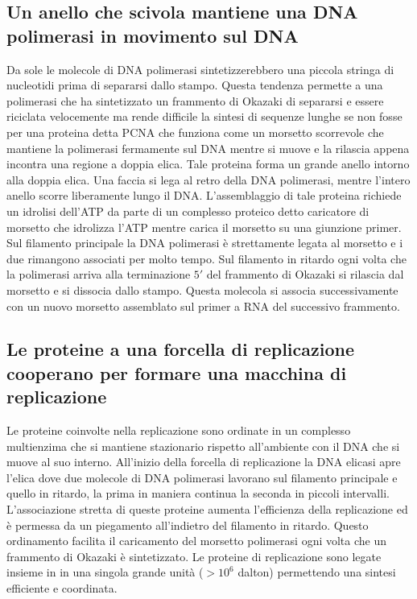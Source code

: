 \subsection{Un anello che scivola mantiene una DNA polimerasi in movimento sul DNA}
Da sole le molecole di DNA polimerasi sintetizzerebbero una piccola stringa di nucleotidi prima di separarsi dallo stampo. Questa tendenza permette a una polimerasi che ha sintetizzato 
un frammento di Okazaki di separarsi e essere riciclata velocemente ma rende difficile la sintesi di sequenze lunghe se non fosse per una proteina detta PCNA che funziona come un
morsetto scorrevole che mantiene la polimerasi fermamente sul DNA mentre si muove e la rilascia appena incontra una regione a doppia elica. Tale proteina forma un grande anello intorno
alla doppia elica. Una faccia si lega al retro della DNA polimerasi, mentre l'intero anello scorre liberamente lungo il DNA. L'assemblaggio di tale proteina richiede un idrolisi 
dell'ATP da parte di un complesso proteico detto caricatore di morsetto che idrolizza l'ATP mentre carica il morsetto su una giunzione primer. Sul filamento principale la DNA polimerasi
\`e strettamente legata al morsetto e i due rimangono associati per molto tempo. Sul filamento in ritardo ogni volta che la polimerasi arriva alla terminazione $5'$ del frammento di 
Okazaki si rilascia dal morsetto e si dissocia dallo stampo. Questa molecola si associa successivamente con un nuovo morsetto assemblato sul primer a RNA del successivo frammento.
\subsection{Le proteine a una forcella di replicazione cooperano per formare una macchina di replicazione}
Le proteine coinvolte nella replicazione sono ordinate in un complesso multienzima che si mantiene stazionario rispetto all'ambiente con il DNA che si muove al suo interno. All'inizio
della forcella di replicazione la DNA elicasi apre l'elica dove due molecole di DNA polimerasi lavorano sul filamento principale e quello in ritardo, la prima in maniera continua la
seconda in piccoli intervalli. L'associazione stretta di queste proteine aumenta l'efficienza della replicazione ed \`e permessa da un piegamento all'indietro del filamento in 
ritardo. Questo ordinamento facilita il caricamento del morsetto polimerasi ogni volta che un frammento di Okazaki \`e sintetizzato. Le proteine di replicazione sono legate insieme in
in una singola grande unit\`a ($>10^6$ dalton) permettendo una sintesi efficiente e coordinata. 
